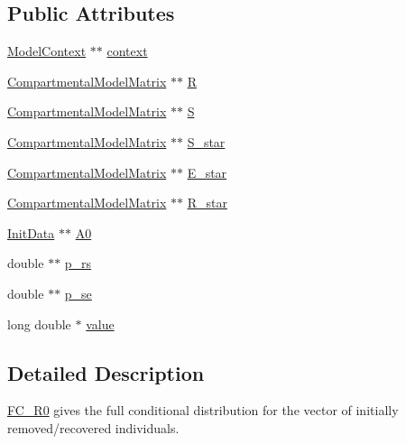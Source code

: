 \subsection*{Public Attributes}
\begin{DoxyCompactItemize}
\item 
\hyperlink{classSpatialSEIR_1_1ModelContext}{Model\-Context} $\ast$$\ast$ \hyperlink{classSpatialSEIR_1_1FC__R0_add24ef73a930cd4f82a2bd742dd4391c}{context}
\item 
\hyperlink{classSpatialSEIR_1_1CompartmentalModelMatrix}{Compartmental\-Model\-Matrix} $\ast$$\ast$ \hyperlink{classSpatialSEIR_1_1FC__R0_a9f63d92307651fc78bae13c5c6801f60}{R}
\item 
\hyperlink{classSpatialSEIR_1_1CompartmentalModelMatrix}{Compartmental\-Model\-Matrix} $\ast$$\ast$ \hyperlink{classSpatialSEIR_1_1FC__R0_a16109df358db796d8f6eefd6a82dbf9f}{S}
\item 
\hyperlink{classSpatialSEIR_1_1CompartmentalModelMatrix}{Compartmental\-Model\-Matrix} $\ast$$\ast$ \hyperlink{classSpatialSEIR_1_1FC__R0_abec5870b4f34a144d70be8e8dbe8119a}{S\-\_\-star}
\item 
\hyperlink{classSpatialSEIR_1_1CompartmentalModelMatrix}{Compartmental\-Model\-Matrix} $\ast$$\ast$ \hyperlink{classSpatialSEIR_1_1FC__R0_a25b1a9ba08198ad0a8b518ed15889294}{E\-\_\-star}
\item 
\hyperlink{classSpatialSEIR_1_1CompartmentalModelMatrix}{Compartmental\-Model\-Matrix} $\ast$$\ast$ \hyperlink{classSpatialSEIR_1_1FC__R0_a8596e0fe8d0489613f9e6c0687b9f9f9}{R\-\_\-star}
\item 
\hyperlink{classSpatialSEIR_1_1InitData}{Init\-Data} $\ast$$\ast$ \hyperlink{classSpatialSEIR_1_1FC__R0_a9a1b73671ac1afcd6c2df5246725498d}{A0}
\item 
double $\ast$$\ast$ \hyperlink{classSpatialSEIR_1_1FC__R0_aa84194ed97d0f2f1c476ca13b5d99ec3}{p\-\_\-rs}
\item 
double $\ast$$\ast$ \hyperlink{classSpatialSEIR_1_1FC__R0_ab38fec9975fe0137fec522b1e78874d0}{p\-\_\-se}
\item 
long double $\ast$ \hyperlink{classSpatialSEIR_1_1FC__R0_a9ef45e653aff78f2fc3e589d1efbfdf2}{value}
\end{DoxyCompactItemize}


\subsection{Detailed Description}
\hyperlink{classSpatialSEIR_1_1FC__R0}{F\-C\-\_\-\-R0} gives the full conditional distribution for the vector of initially removed/recovered individuals. 

